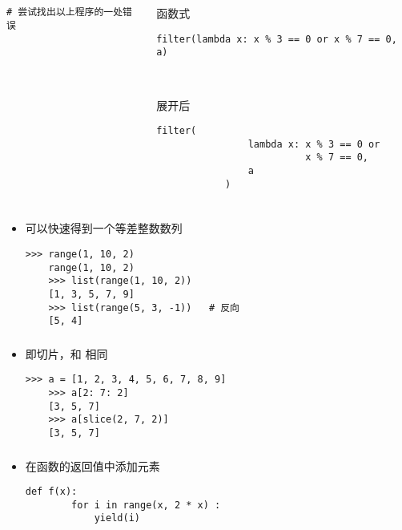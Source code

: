 \begin{CJK}{UTF8}{gbsn}
\begin{frame} [fragile]
\begin{columns}
\begin{column}[T]{.42\textwidth}
\begin{lstlisting}[style=pythonstyle, gobble=12, texcl]
			# 尝试找出以上程序的一处错误
			\end{lstlisting}
		\end{column}
		\begin{column}[T]{.58\textwidth}
			函数式
			\begin{lstlisting}[style=pythonstyle, gobble=12, texcl]
			filter(lambda x: x % 3 == 0 or x % 7 == 0, a)
			\end{lstlisting}

			\

			展开后
			\begin{lstlisting}[style=pythonstyle, gobble=12, texcl]
			filter(
				lambda x: x % 3 == 0 or 
						  x % 7 == 0,
				a
			)
			\end{lstlisting}
		\end{column}
	\end{columns}
\end{frame}

\begin{frame} [fragile]
	\frametitle{}
	\linespread{1.25}
	\begin{itemize}
	\item {}可以快速得到一个等差整数数列
	\begin{lstlisting}[style=pythonstyle, gobble=4, texcl]
	>>> range(1, 10, 2)
	range(1, 10, 2)
	>>> list(range(1, 10, 2))
	[1, 3, 5, 7, 9]
	>>> list(range(5, 3, -1))	# 反向
	[5, 4]
	\end{lstlisting}
	\end{itemize}
\end{frame}

\begin{frame} [fragile]
	\frametitle{}
	\linespread{1.25}
	\begin{itemize}
	\item {}即切片，和 \inlinePython{[a:b:c]} 相同
	\begin{lstlisting}[style=pythonstyle, gobble=4, texcl]
	>>> a = [1, 2, 3, 4, 5, 6, 7, 8, 9]
	>>> a[2: 7: 2]
	[3, 5, 7]
	>>> a[slice(2, 7, 2)]
	[3, 5, 7]
	\end{lstlisting}
	\end{itemize}
\end{frame}

\begin{frame} [fragile]
	\frametitle{}
	\begin{itemize}
	\item {}在函数的返回值中添加元素
	\begin{lstlisting}[style=pythonstyle, gobble=4, texcl]
	def f(x):
		for i in range(x, 2 * x) :
			yield(i)


\end{lstlisting}
\end{itemize}
\end{frame}
\end{CJK}
